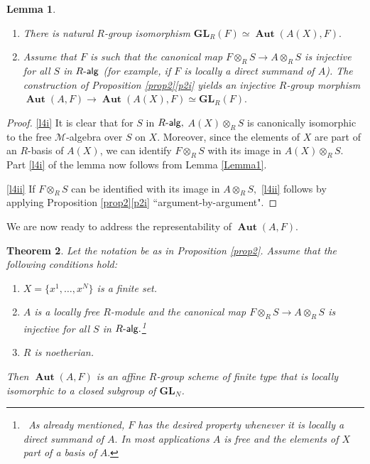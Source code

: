 \documentclass{article}
\newtheorem{thm}{Theorem}
\newtheorem{lem}[thm]{Lemma}
\theoremstyle{definition}
\def\BAut{\ensuremath{\operatorname{\mathbf{Aut}}}}
\def\Ralg{\ensuremath{R\text{-\textup{\textsf{alg}}}}}
\def\BGL{\ensuremath{\mathbf{G}\mathbf{L}}}
\def\Mu{\ensuremath{\mathcal{M}}}
\begin{document}
\begin{lem} \label{lem4}
\begin{enumerate}[label = (\roman*)]
	\item \label{l4i} 
There is natural  $R$-group isomorphism $\BGL_R(F) \simeq \BAut(A(X),F).$
\item \label{l4ii}  Assume that $F$ is such that the canonical map $F \otimes_R S \to A \otimes_R S$ is injective for all $S$ in $\Ralg$ (for example, if $F$ is locally a direct summand of $A$). The construction of Proposition \ref{prop2}\ref{p2i} yields an injective $R$-group morphism $\BAut(A,F) \to \BAut(A(X),F) \simeq \BGL_{R}(F).$
\end{enumerate}
\end{lem}
\begin{proof} \ref{l4i} It is clear that for $S$ in $\Ralg,$ $A(X)\otimes_RS$ is canonically isomorphic to the free $\Mu$-algebra over $S$ on $X.$ Moreover, since the elements of $X$ are part of an $R$-basis of $A(X)$, we can  identify $F \otimes_R S$ with its image in $A(X) \otimes_R S.$ Part \ref{l4i} of the lemma now follows from Lemma \ref{Lemma1}. 

	\ref{l4ii} If $F \otimes_R S$ can be identified with its image in $A \otimes_R S,$ \ref{l4ii} follows by applying Proposition \ref{prop2}\ref{p2i} ``argument-by-argument".
\end{proof}

We are now ready to address the representability of $\BAut(A,F).$ 

\begin{thm}\label{autrep}
	Let the notation be as in Proposition \ref{prop2}. Assume that the following conditions hold:
	\begin{enumerate}[label =(\alph*)]
		\item $X = \{x^1, \dots, x^N\}$ is a finite set. 
	
		\item  $A$ is a locally free $R$-module and the canonical map $F \otimes_R S \to A \otimes_R S$ is injective for all $S$ in $\Ralg.$\footnote{\, As already mentioned, $F$ has the desired property whenever it is locally a direct summand of $A.$ In most applications $A$ is free and the elements of $X$  part of a basis of $A.$}
		
		\item  $R$ is noetherian.
	\end{enumerate}
Then  $\BAut(A,F)$ is an affine $R$-group scheme of finite type that is locally isomorphic to a closed subgroup of $\BGL_N$. \end{thm}
\end{document}
